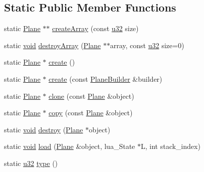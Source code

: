 \subsection*{Static Public Member Functions}
\begin{DoxyCompactItemize}
\item 
static \mbox{\hyperlink{classnjli_1_1_plane}{Plane}} $\ast$$\ast$ \mbox{\hyperlink{classnjli_1_1_plane_abdba856cfdd6d38b011dfe684a4dde19}{create\+Array}} (const \mbox{\hyperlink{_util_8h_a10e94b422ef0c20dcdec20d31a1f5049}{u32}} size)
\item 
static \mbox{\hyperlink{_thread_8h_af1e856da2e658414cb2456cb6f7ebc66}{void}} \mbox{\hyperlink{classnjli_1_1_plane_a5f1fa3ef1069b6ece075986d7c29a7e5}{destroy\+Array}} (\mbox{\hyperlink{classnjli_1_1_plane}{Plane}} $\ast$$\ast$array, const \mbox{\hyperlink{_util_8h_a10e94b422ef0c20dcdec20d31a1f5049}{u32}} size=0)
\item 
static \mbox{\hyperlink{classnjli_1_1_plane}{Plane}} $\ast$ \mbox{\hyperlink{classnjli_1_1_plane_ac092b738af84c49c487a67a79af4ea9d}{create}} ()
\item 
static \mbox{\hyperlink{classnjli_1_1_plane}{Plane}} $\ast$ \mbox{\hyperlink{classnjli_1_1_plane_afa389a6efdc6ea1c74c923bd82b6445a}{create}} (const \mbox{\hyperlink{classnjli_1_1_plane_builder}{Plane\+Builder}} \&builder)
\item 
static \mbox{\hyperlink{classnjli_1_1_plane}{Plane}} $\ast$ \mbox{\hyperlink{classnjli_1_1_plane_a42586e08719e750272614dbe1b1a077c}{clone}} (const \mbox{\hyperlink{classnjli_1_1_plane}{Plane}} \&object)
\item 
static \mbox{\hyperlink{classnjli_1_1_plane}{Plane}} $\ast$ \mbox{\hyperlink{classnjli_1_1_plane_a06750ef9f0dbb17a36e6c202b7be7e96}{copy}} (const \mbox{\hyperlink{classnjli_1_1_plane}{Plane}} \&object)
\item 
static \mbox{\hyperlink{_thread_8h_af1e856da2e658414cb2456cb6f7ebc66}{void}} \mbox{\hyperlink{classnjli_1_1_plane_a30b48bc2acf03778e7024f93735a9fe2}{destroy}} (\mbox{\hyperlink{classnjli_1_1_plane}{Plane}} $\ast$object)
\item 
static \mbox{\hyperlink{_thread_8h_af1e856da2e658414cb2456cb6f7ebc66}{void}} \mbox{\hyperlink{classnjli_1_1_plane_a700d1782cad579cd37c12e8f6c1e9f3e}{load}} (\mbox{\hyperlink{classnjli_1_1_plane}{Plane}} \&object, lua\+\_\+\+State $\ast$L, int stack\+\_\+index)
\item 
static \mbox{\hyperlink{_util_8h_a10e94b422ef0c20dcdec20d31a1f5049}{u32}} \mbox{\hyperlink{classnjli_1_1_plane_ae6dc5ea1dbfbfed13d99ca25ef4b36d4}{type}} ()
\end{DoxyCompactItemize}
